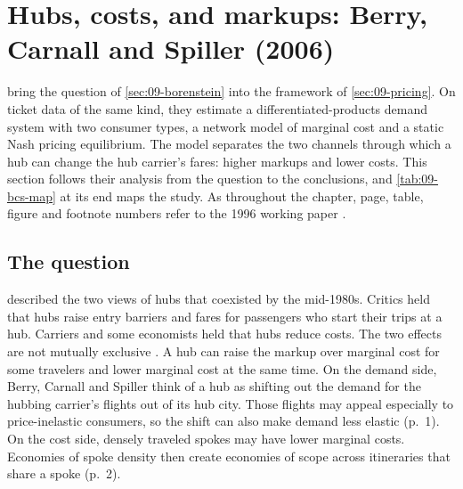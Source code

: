 \section{Hubs, costs, and markups: Berry, Carnall and Spiller (2006)}\label{sec:09-bcs}

\citet{BerryCarnallSpiller2006} bring the question of \cref{sec:09-borenstein} into the framework of
\cref{sec:09-pricing}. On ticket data of the same kind, they estimate a differentiated-products demand
system with two consumer types, a network model of marginal cost and a static Nash pricing equilibrium.
The model separates the two channels through which a hub can change the hub carrier's fares: higher markups
and lower costs. This section follows their analysis from the question to the conclusions, and
\cref{tab:09-bcs-map} at its end maps the study. As throughout the chapter, page, table, figure and footnote numbers refer to the 1996 working paper
\citep{BerryCarnallSpiller1996}.

\subsection{The question}\label{sec:09-bcs-question}

 described the two views of hubs that coexisted by the mid-1980s. Critics held that hubs
raise entry barriers and fares for passengers who start their trips at a hub. Carriers and some economists
held that hubs reduce costs. The two effects are not mutually exclusive \citep{Berry1990}. A hub can raise
the markup over marginal cost for some travelers and lower marginal cost at the same time. On the demand
side, Berry, Carnall and
Spiller think of a hub as shifting out the demand for the hubbing carrier's flights out of its hub city.
Those flights may appeal especially to price-inelastic consumers, so the shift can also make demand less
elastic (p.~1). On the cost side, densely traveled spokes may have lower marginal costs. Economies of spoke
density then create economies of scope across itineraries that share a spoke (p.~2).

